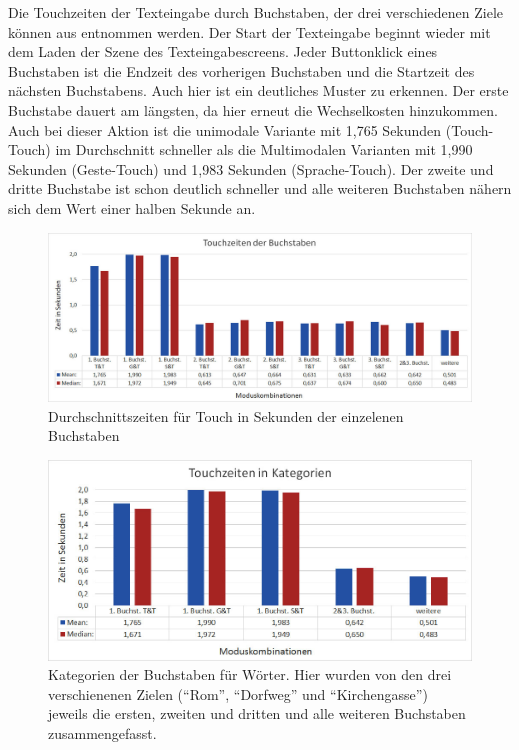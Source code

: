 Die Touchzeiten der Texteingabe durch Buchstaben, der drei verschiedenen Ziele können aus  entnommen werden.
Der Start der Texteingabe beginnt wieder mit dem Laden der Szene des Texteingabescreens.
Jeder Buttonklick eines Buchstaben ist die Endzeit des vorherigen Buchstaben und die Startzeit des nächsten Buchstabens.
Auch hier ist ein deutliches Muster zu erkennen. 
Der erste Buchstabe dauert am längsten, da hier erneut die Wechselkosten hinzukommen. 
Auch bei dieser Aktion ist die unimodale Variante mit 1,765 Sekunden (Touch-Touch) im Durchschnitt schneller als die Multimodalen Varianten mit 1,990 Sekunden (Geste-Touch) und 1,983 Sekunden (Sprache-Touch).
Der zweite und dritte Buchstabe ist schon deutlich schneller und alle weiteren Buchstaben nähern sich dem Wert einer halben Sekunde an. 
\begin{figure}[ht]
  \centering
  \includegraphics[width=1\textwidth]{img/TouchzeitenBuchstabenGesamt.jpg}
  \caption{Durchschnittszeiten für Touch in Sekunden der einzelenen Buchstaben}
  \label{fig:TouchzeitenB_Ges}
\end{figure}
\begin{figure}[ht]
  \centering
  \includegraphics[width=1\textwidth]{img/TouchzeitenKategorien.JPG}
  \caption[Kategorien der Buchstaben für Wörter.]{Kategorien der Buchstaben für Wörter. Hier wurden von den drei verschienenen Zielen ("`Rom"', "`Dorfweg"' und "`Kirchengasse"') jeweils die ersten, zweiten und dritten und alle weiteren Buchstaben zusammengefasst.}
  \label{fig:Kategorien}
\end{figure} 


